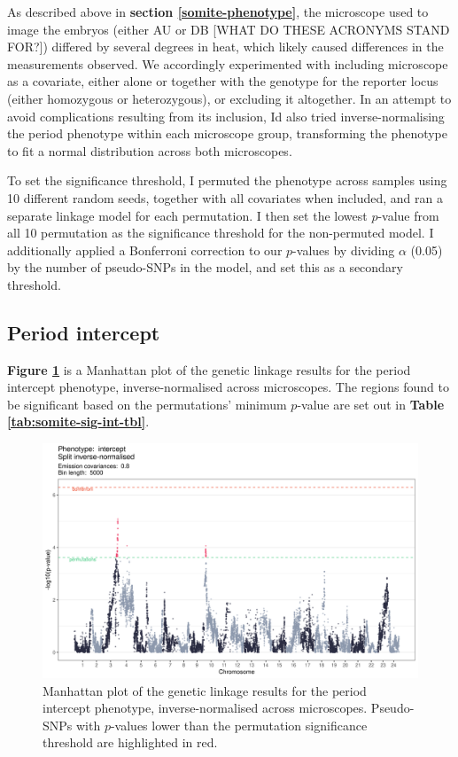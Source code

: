 \documentclass[
]{book}
\begin{document}
As described above in \textbf{section \ref{somite-phenotype}}, the microscope used to image the embryos (either AU or DB {[}WHAT DO THESE ACRONYMS STAND FOR?{]}) differed by several degrees in heat, which likely caused differences in the measurements observed. We accordingly experimented with including microscope as a covariate, either alone or together with the genotype for the reporter locus (either homozygous or heterozygous), or excluding it altogether. In an attempt to avoid complications resulting from its inclusion, Id also tried inverse-normalising the period phenotype within each microscope group, transforming the phenotype to fit a normal distribution across both microscopes.

To set the significance threshold, I permuted the phenotype across samples using 10 different random seeds, together with all covariates when included, and ran a separate linkage model for each permutation. I then set the lowest \(p\)-value from all 10 permutation as the significance threshold for the non-permuted model. I additionally applied a Bonferroni correction to our \(p\)-values by dividing \(\alpha\) (0.05) by the number of pseudo-SNPs in the model, and set this as a secondary threshold.

\hypertarget{period-intercept}{%
\subsection{Period intercept}\label{period-intercept}}

\textbf{Figure \ref{fig:somite-manhattan}} is a Manhattan plot of the genetic linkage results for the period intercept phenotype, inverse-normalised across microscopes. The regions found to be significant based on the permutations' minimum \(p\)-value are set out in \textbf{Table \ref{tab:somite-sig-int-tbl}}.



\begin{figure}
\includegraphics[width=1\linewidth]{figs/somites/manhattan_intercept} \caption{Manhattan plot of the genetic linkage results for the period intercept phenotype, inverse-normalised across microscopes. Pseudo-SNPs with \(p\)-values lower than the permutation significance threshold are highlighted in red.}\label{fig:somite-manhattan}
\end{figure}
\end{document}
